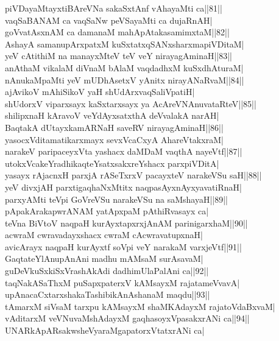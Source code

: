 \documentclass{article}
\begin{document}
piVDayaMtayxtiBAreVNa sakaSxtAnf vAhayaMti ca||81||\\
vaqSaBANAM ca vaqSaNw peVSayaMti ca dujaRnAH|\\
goVvatAsxnAM ca damanaM mahApAtakasamimxtaM||82||\\
AshayA samanupArxpatxM kuSxtatxqSANxsharxmapiVDitaM|\\
yeV cAtithiM na manayxMteV teV veY nirayagAminaH||83||\\
anAthaM vikalaM diVnaM bAlaM vaqdadhxM kuSxdhAturaM|\\
nAnukaMpaMti yeV mUDhAsetxV yAnitx nirayANaRvaM||84||\\
ajAvikoV mAhiSikoV yaH shUdArxvaqSaliVpatiH|\\
shUdorxV viparxsayx kaSxtarxsayx ya AcAreVNAnuvataRteV||85||\\
shilipxnaH kAravoV veYdAyxsatxthA deVvalakA narAH|\\
BaqtakA dUtayxkamARNaH saveRV nirayagAminaH||86||\\
yasocxVditamatikarxmayx sevxVcaCxyA AhareVtakxraM|\\
narakeV paripaceyxVta yashacx daMDaM vaqthA nayeVtf||87||\\
utokxVcakeYradhikaqteYsatxsakxreYshacx parxpiVDitA|\\
yasayx rAjacnxH parxjA rASeTxrxV pacayxteV narakeVSu saH||88||\\
yeV divxjAH parxtigaqhaNxMtitx naqpasAyxnAyxyavatiRnaH|\\
parxyAMti teVpi GoVreVSu narakeVSu na saMshayaH||89||\\
pApakArakapwrANAM yatApxpaM pAthiRvasayx ca|\\
teVna BiVtoV naqpaH kurAyxtapxrxjAnAM parinigarxhaM||90||\\
acwraM cwravadayxshacx cwraM cAcwravatupxnaH|\\
avicArayx naqpaH kurAyxtf soVpi veY narakaM varxjeVtf||91||\\
GaqtateYlAnupAnAni madhu mAMsaM surAsavaM|\\
guDeVkuSxkiSxVrashAkAdi dadhimUlaPalAni ca||92||\\
taqNakASaThxM puSapxpaterxV kAMsayxM rajatameVvavA|\\
upAnacaCxtarxshakaTashibikAnAshanaM maqdu||93||\\
tAmarxM siVsaM tarxpu kAMsayxM shaMKAdayxM rajatoVdaBxvaM|\\
vAditarxM veVNuvaMshAdayxM gaqhasoyxVpasakxrANi ca||94||\\
UNARkApARsakwsheVyaraMgapatorxVtatxrANi ca|\\
\end{document}
